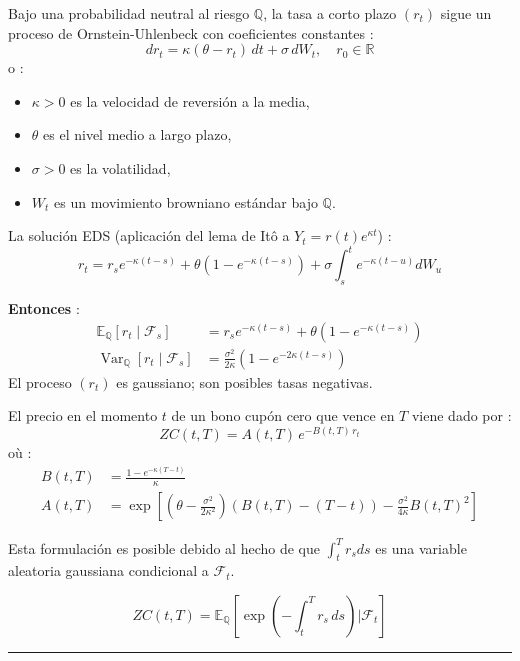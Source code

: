 \begin{f}
	
	Bajo una probabilidad neutral al riesgo \(\mathbb{Q}\), la tasa a corto plazo \((r_t)\) sigue un proceso de Ornstein-Uhlenbeck con coeficientes constantes :
	\[
	dr_t = \kappa(\theta - r_t)\, dt + \sigma\, dW_t, \quad r_0 \in \mathbb{R}
	\]
	o :
	\begin{itemize}[nosep]
		\item \(\kappa > 0\) es la velocidad de reversión a la media,
		\item \(\theta\) es el nivel medio a largo plazo,
		\item \(\sigma > 0\) es la volatilidad,
		\item \(W_t\) es un movimiento browniano estándar bajo \(\mathbb{Q}\).
	\end{itemize}
	
La solución EDS (aplicación del lema de Itô a \(Y_{t}=r(t) e^{\kappa t}\)) :
	\[
	r_t = r_s e^{-\kappa(t-s)} + \theta(1 - e^{-\kappa(t-s)}) + \sigma \int_s^t e^{-\kappa(t-u)} dW_u
	\]
	
	\textbf{Entonces} :
	\[
	\begin{aligned}
		\mathbb{E}_\mathbb{Q}[r_t \mid \mathcal{F}_s] &= r_s e^{-\kappa(t-s)} + \theta(1 - e^{-\kappa(t-s)}) \\
		\operatorname{Var}_\mathbb{Q}[r_t \mid \mathcal{F}_s] &= \frac{\sigma^2}{2\kappa} \left(1 - e^{-2\kappa(t-s)}\right)
	\end{aligned}
	\]
El proceso \((r_t)\) es gaussiano; son posibles tasas negativas.
	
\end{f}

\begin{f}

El precio en el momento \(t\) de un bono cupón cero que vence en \(T\) viene dado por :
\[
ZC(t, T) = A(t, T) \, e^{-B(t, T)\, r_t}
\]
où :
\[
\begin{aligned}
	B(t, T) &= \frac{1 - e^{-\kappa(T - t)}}{\kappa} \\
	A(t, T) &= \exp \left[ \left(\theta - \frac{\sigma^2}{2\kappa^2}\right) (B(t, T) - (T - t)) - \frac{\sigma^2}{4\kappa} B(t, T)^2 \right]
\end{aligned}
\]

Esta formulación es posible debido al hecho de que \(\int_t^T r_s ds\) es una variable aleatoria gaussiana condicional a \(\mathcal{F}_t\).

\[
ZC(t, T) = \mathbb{E}_\mathbb{Q} \left[ \exp\left( -\int_t^T r_s\, ds \right) \Big| \mathcal{F}_t \right]
\]

\end{f}
\hrule

